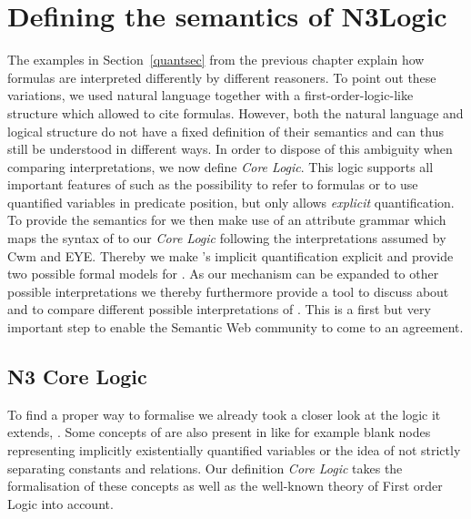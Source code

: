 
\chapter{Defining the semantics of N3Logic}
The examples in Section~\ref{quantsec} from the previous chapter explain how \nthree formulas are interpreted differently by different reasoners. To point out these variations,
we used natural language together with a
first-order-logic-like structure which allowed to cite formulas. 
However, both the natural language and logical structure do not have a fixed definition of their semantics
and can 
thus still be understood in different 
ways. In order to dispose of this ambiguity when comparing interpretations, 
 we  now define \emph{\nthree Core Logic}. 
This logic  supports all important features of \nthree such as the possibility to refer to formulas or to use quantified variables in predicate position, 
but only allows \emph{explicit} quantification. 
To provide the semantics for \nthreelogic we then make use of an attribute grammar  which maps the syntax of \nthree to our  \emph{\nthree Core Logic} following the interpretations 
assumed by Cwm and EYE.
Thereby we make \nthree's implicit quantification explicit and provide 
two possible formal models for \nthree. 
As our mechanism can be expanded to other possible interpretations we thereby furthermore provide a tool to discuss about and to compare different possible interpretations
of \nthreelogic. This is a first but very important step to enable the Semantic Web community to come to an agreement.

\section{N3 Core Logic}\label{core}
To find a proper way to formalise \nthreelogic  we already took a closer look at the logic it extends, \rdf. 
Some concepts of \nthree are also present in \rdf like for example blank nodes representing implicitly existentially quantified variables or the idea of not strictly separating 
constants and 
relations. Our definition \emph{\nthree Core Logic} %
takes the formalisation of these concepts as well as the well-known theory of First order Logic into account. 

